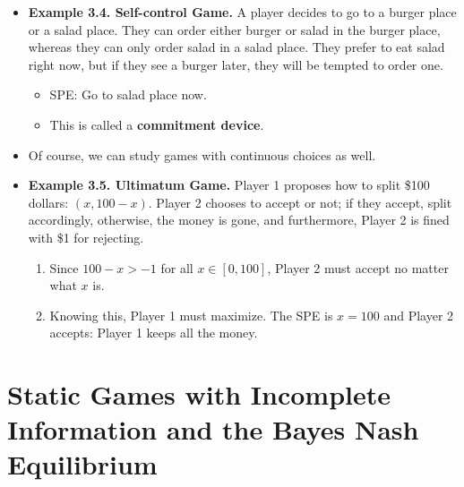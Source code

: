 \documentclass[notitlepage]{article}
\begin{document}
\begin{itemize}
    \item \textbf{Example 3.4. Self-control Game.} A player decides to go to a burger place or a salad place. They can order either burger or salad in the burger place, whereas they can only order salad in a salad place. They prefer to eat salad right now, but if they see a burger later, they will be tempted to order one.

    \newpage
    \begin{figure}[h]
    \centering
    \resizebox{0.4\textwidth}{!}{
    
    }
    \end{figure}

    \begin{itemize}
        \item SPE: Go to salad place now.
        \item This is called a \textbf{commitment device}.
    \end{itemize}

    \item Of course, we can study games with continuous choices as well.

    \item \textbf{Example 3.5. Ultimatum Game.} Player 1 proposes how to split \$100 dollars: \((x, 100-x)\). Player 2 chooses to accept or not; if they accept, split accordingly, otherwise, the money is gone, and furthermore, Player 2 is fined with \$1 for rejecting.

    \begin{figure}[h]
    \centering
    \resizebox{0.4\textwidth}{!}{
    
    }
    \end{figure}

    \begin{enumerate}
        \item Since \(100-x > -1\) for all \(x \in [0,100]\), Player 2 must accept no matter what \(x\) is.
        \item Knowing this, Player 1 must maximize. The SPE is \(x = 100\) and Player 2 accepts: Player 1 keeps all the money.
    \end{enumerate}
    
\end{itemize}

\section{Static Games with Incomplete Information and the Bayes Nash Equilibrium}
\end{document}
